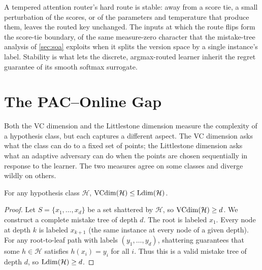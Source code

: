 \begin{remark}
\label{rmk:route-stability}
A tempered attention router's hard route is stable: away from a score tie, a small perturbation of the scores, or of the parameters and temperature that produce them, leaves the routed key unchanged. The inputs at which the route flips form the score-tie boundary, of the same measure-zero character that the mistake-tree analysis of \cref{sec:soa} exploits when it splits the version space by a single instance's label.  Stability is what lets the discrete, argmax-routed learner inherit the regret guarantee of its smooth softmax surrogate.
\end{remark}

\section{The PAC--Online Gap}
\label{sec:pac-online-gap}

Both the VC dimension and the Littlestone dimension measure the complexity of a hypothesis class, but each captures a different aspect. The VC dimension asks what the class can do to a fixed set of points; the Littlestone dimension asks what an adaptive adversary can do when the points are chosen sequentially in response to the learner. The two measures agree on some classes and diverge wildly on others.

\begin{prop}[$\VC \leq \Ldim$]
\label{prop:vc-leq-ldim}
For any hypothesis class $\mathcal{H}$, $\mathrm{VCdim}(\mathcal{H}) \leq \mathrm{Ldim}(\mathcal{H})$.
\end{prop}

\begin{proof}
Let $S = \{x_1, \ldots, x_d\}$ be a set shattered by $\mathcal{H}$, so $\mathrm{VCdim}(\mathcal{H}) \geq d$. We construct a complete mistake tree of depth $d$. The root is labeled $x_1$. Every node at depth $k$ is labeled $x_{k+1}$ (the same instance at every node of a given depth). For any root-to-leaf path with labels $(y_1, \ldots, y_d)$, shattering guarantees that some $h \in \mathcal{H}$ satisfies $h(x_i) = y_i$ for all $i$. Thus this is a valid mistake tree of depth $d$, so $\mathrm{Ldim}(\mathcal{H}) \geq d$.
\end{proof}

